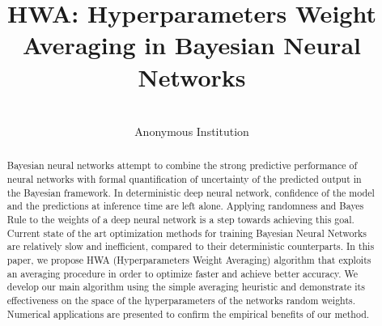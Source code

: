 \documentclass[tablecaption=bottom,wcp]{jmlr}
\title[Hyperparameters Weight Averaging in BNNs]{HWA: Hyperparameters Weight Averaging in Bayesian Neural Networks}
\author{\Name{Anonymous Authors}\\
  \addr Anonymous Institution}
\begin{document}
\maketitle


\begin{abstract}
Bayesian neural networks attempt to combine the strong predictive performance of neural networks with formal quantification of uncertainty of the predicted output in the Bayesian framework.
In deterministic deep neural network, confidence of the model and the predictions at inference time are left alone. 
Applying randomness and Bayes Rule to the weights of a deep neural network is a step towards achieving this goal. Current state of the art optimization methods for training Bayesian Neural Networks are relatively slow and inefficient, compared to their deterministic counterparts. 
In this paper, we propose \textsc{HWA} (Hyperparameters Weight Averaging) algorithm that exploits an averaging procedure in order to optimize faster and achieve better accuracy. 
We develop our main algorithm using the simple averaging heuristic and demonstrate its effectiveness on the space of the hyperparameters of the networks random weights. 
Numerical applications are presented to confirm the empirical benefits of our method.
\end{abstract}
\end{document}
